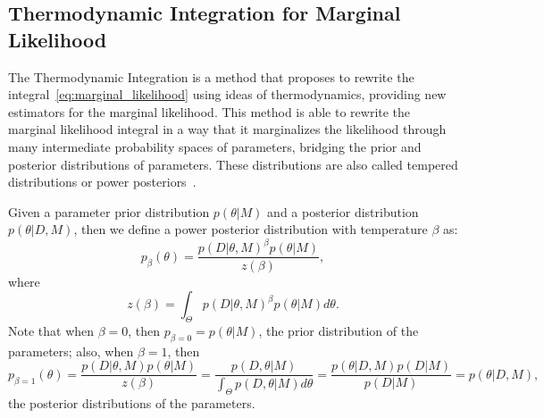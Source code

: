 \subsection{Thermodynamic Integration for Marginal Likelihood}
The Thermodynamic Integration is a method that proposes to rewrite
the integral~\ref{eq:marginal_likelihood} using ideas of thermodynamics,
providing new estimators for the marginal likelihood. This method is
able to rewrite the marginal likelihood integral in a way that it 
marginalizes the likelihood through many intermediate probability spaces 
of parameters, bridging the prior and posterior distributions of 
parameters. These distributions are also called tempered distributions
or power posteriors~\cite{Friel2008}.

Given a parameter prior distribution $p (\theta | M)$ and a posterior 
distribution $p (\theta | D, M)$, then we define a power posterior 
distribution with temperature $\beta$ as:
\begin{equation*}
    p_{\beta} (\theta) = \frac{p (D | \theta, M)^\beta p(\theta | M)}
                              {z (\beta)},
\end{equation*}
where
\begin{equation*}
    z (\beta) = \int_\Theta p (D | \theta, M)^\beta p(\theta | M) 
            d\theta.
\end{equation*}
Note that when $\beta = 0$, then $p_{\beta=0} = p (\theta | M)$, the 
prior distribution of the parameters; also, when $\beta = 1$, then
\begin{equation*}
    p_{\beta=1}(\theta) = \frac{p (D | \theta, M) p(\theta | M)}
                         {z (\beta)}
                        =\frac{p (D, \theta|M)}
                              {\int_\Theta p (D, \theta | M)d\theta}
                        =\frac{p(\theta | D, M) p(D|M)}{p (D | M)}
                        =p (\theta | D, M),
\end{equation*}
the posterior distributions of the parameters.

